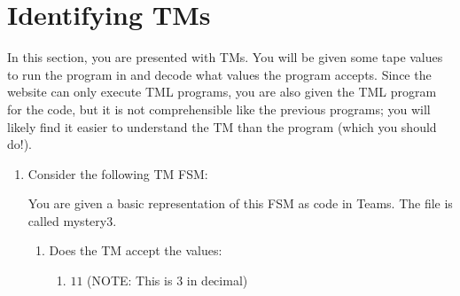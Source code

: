 \documentclass[answers]{exam}
\begin{document}
    \section{Identifying TMs}
    In this section, you are presented with TMs. You will be given some tape values to run the program in and decode what values the program accepts. Since the website can only execute TML programs, you are also given the TML program for the code, but it is not comprehensible like the previous programs; you will likely find it easier to understand the TM than the program (which you should do!). 
    \begin{enumerate}
        \item Consider the following TM FSM:
        \begin{figure}[H]
            \centering
        \end{figure}
        You are given a basic representation of this FSM as code in Teams. The file is called mystery3.
        \begin{enumerate}
            \item Does the TM accept the values:
            \begin{enumerate}
                \item $11$ (NOTE: This is $3$ in decimal)
                \begin{solution}
                    
                \end{solution}


\end{enumerate}
\end{enumerate}
\end{enumerate}
\end{document}
